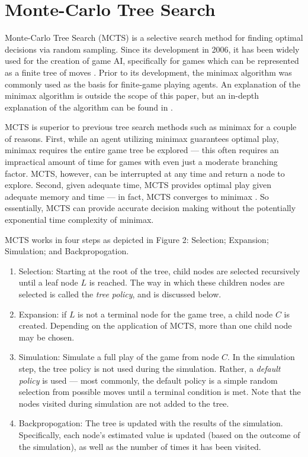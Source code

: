 \section{Monte-Carlo Tree Search}\label{sec:mcts}
Monte-Carlo Tree Search (MCTS) is a selective search method for finding optimal decisions via random sampling. Since its development in 2006, it has been widely used for the creation of game AI, specifically for games which can be represented as a finite tree of moves \cite{chaslot2008monte, browne2012survey}.  Prior to its development, the minimax algorithm was commonly used as the basis for finite-game playing agents.  An explanation of the minimax algorithm is outside the scope of this paper, but an in-depth explanation of the algorithm can be found in \cite{minimax}.

MCTS is superior to previous tree search methods such as minimax for a couple of reasons.  First, while an agent utilizing minimax guarantees optimal play, minimax requires the entire game tree be explored --- this often requires an impractical amount of time for games with even just a moderate branching factor.  MCTS, however, can be interrupted at any time and return a node to explore.  Second, given adequate time, MCTS provides optimal play given adequate memory and time --- in fact, MCTS converges to minimax \cite{browne2012survey}.  So essentially, MCTS can provide accurate decision making without the potentially exponential time complexity of minimax.  

MCTS works in four steps as depicted in Figure 2: Selection; Expansion; Simulation; and Backpropogation.
\begin{enumerate}
    \item  Selection: Starting at the root of the tree, child nodes are selected recursively until a leaf node $L$ is reached.  The way in which these children nodes are selected is called the \textit{tree policy}, and is discussed below.
    
    \item Expansion: if $L$ is not a terminal node for the game tree, a child node $C$ is created.  Depending on the application of MCTS, more than one child node may be chosen.
    
    \item Simulation: Simulate a full play of the game from node $C$.  In the simulation step, the tree policy is not used during the simulation.  Rather, a \textit{default policy} is used --- most commonly, the default policy is a simple random selection from possible moves until a terminal condition is met.  Note that the nodes visited during simulation are not added to the tree.
    
    \item Backpropogation: The tree is updated with the results of the simulation.  Specifically, each node's estimated value is updated (based on the outcome of the simulation), as well as the number of times it has been visited.
\end{enumerate}

